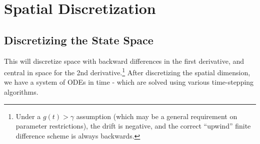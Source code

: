 \documentclass[11pt]{article}
\begin{document}
\newpage
\appendix
\makeatletter
\def\@seccntformat#1{Appendix\ \csname the#1\endcsname\quad}
\makeatother
\makeatletter
\def\@seccntformat#1{\csname Pref@#1\endcsname \csname the#1\endcsname\quad}
\def\Pref@section{Appendix~}
\makeatother
{}

\section{Spatial Discretization}\label{sec:discretization}
\subsection{Discretizing the State Space}
This will discretize space with backward differences in the first derivative, and central in space for the 2nd derivative.\footnote{Under a $g(t) > \gamma$ assumption (which may be a general requirement on parameter restrictions), the drift is negative, and the correct ``upwind'' finite difference scheme is always backwards.}  After discretizing the spatial dimension, we have a system of ODEs in time - which are solved using various time-stepping algorithms.
\end{document}
